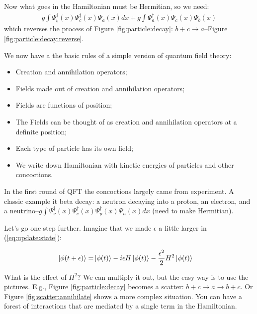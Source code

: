 \documentclass[]{article}
\begin{document}
Now what goes in the Hamiltonian must be Hermitian, so we need:
\begin{align*}
	g \int \Psi^\dagger_b(x) \Psi^\dagger_c(x) \Psi_a(x) dx + g \int \Psi^\dagger_a(x) \Psi_c(x) \Psi_b(x)
\end{align*}
which reverses the process of  Figure \ref{fig:particle:decay}: $b+c\rightarrow a$--Figure \ref{fig:particle:decay:reverse}.

We now have a the basic rules of a simple version of quantum field theory:
\begin{itemize}
	\item Creation and annihilation operators;
	\item Fields made out of creation and annihilation operators;
	\item Fields are functions of position;
	\item The Fields can be thought of as creation and annihilation operators at a definite position;
	\item Each type of particle has its own field;
	\item We write down Hamiltonian with kinetic energies of particles and other concoctions. 
\end{itemize}

In the first round of QFT the concoctions largely came from experiment. A classic example it beta decay: a neutron decaying into a proton, an electron, and a neutrino--$g \int \Psi^\dagger_{\nu}(x) \Psi^\dagger_e(x) \Psi^\dagger_p(x) \Psi_n(x) dx$ (need to make Hermitian).

Let's go one step further. Imagine that we made $\epsilon$ a little larger in (\ref{eq:update:state}):

\begin{align*}
	\ket{\phi(t+\epsilon)} =& \ket{\phi(t)} -i \epsilon H \ket{\phi(t)} - \frac{\epsilon^2}{2} H^2 \ket{\phi(t)}
\end{align*}

What is the effect of $H^2$? We can multiply it out, but the easy way is to use the pictures. E.g., Figure \ref{fig:particle:decay} becomes a scatter: $b+c \rightarrow a \rightarrow b + c$. Or Figure \ref{fig:scatter:annihilate} shows a more complex situation. You can have a forest of interactions that are mediated by a single term in the Hamiltonian. 
\end{document}

